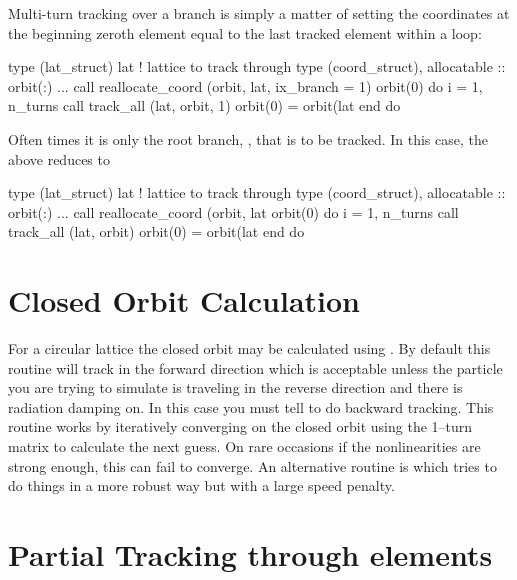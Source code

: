 {{{{{{{{Multi-turn tracking over a branch is simply a matter of
setting the coordinates at the beginning zeroth element equal to the
last tracked element within a loop:
\begin{example}
  type (lat_struct) lat             ! lattice to track through
  type (coord_struct), allocatable :: orbit(:)
  ...
  call reallocate_coord (orbit, lat, ix_branch = 1)
  orbit(0)%
  do i = 1, n_turns
    call track_all (lat, orbit, 1)
    orbit(0) = orbit(lat%
  end do
\end{example}
Often times it is only the root branch, , that is to be tracked.
In this case, the above reduces to
\begin{example}
  type (lat_struct) lat             ! lattice to track through
  type (coord_struct), allocatable :: orbit(:)
  ...
  call reallocate_coord (orbit, lat%
  orbit(0)%
  do i = 1, n_turns
    call track_all (lat, orbit)
    orbit(0) = orbit(lat%
  end do
\end{example}

\section{Closed Orbit Calculation}

For a circular lattice the closed orbit may be calculated using
. By default this routine will track in the
forward direction which is acceptable unless the particle you are
trying to simulate is traveling in the reverse direction and there is
radiation damping on. In this case you must tell
 to do backward tracking. This routine works by
iteratively converging on the closed orbit using the 1--turn matrix to
calculate the next guess. On rare occasions if the nonlinearities are
strong enough, this can fail to converge. An alternative routine is
 which tries to do things in a more
robust way but with a large speed penalty.

\section{Partial Tracking through elements}
\label{s:tracking.partial}

}}}}}}}}
